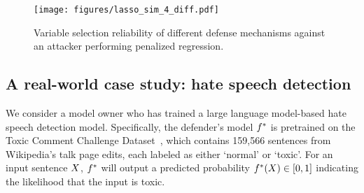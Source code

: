     \begin{figure}
        \centering
        \texttt{[image: figures/lasso\_sim\_4\_diff.pdf]}
        \caption{Variable selection reliability of different defense mechanisms against an attacker performing penalized regression. }
        \label{fig:compare_defense_lasso_diff}
    \end{figure} 


        



\subsection{A real-world case study: hate speech detection}\label{subsec:nlp}
    We consider a model owner who has trained a large language model-based hate speech detection model. 
    Specifically, the defender's model $f^*$ is pretrained on the Toxic Comment Challenge Dataset~\citep{jigsaw-toxic-comment-classification-challenge}, which contains 159,566 sentences from Wikipedia's talk page edits, each labeled as either `normal' or `toxic'. For an input sentence $X$, $f^*$ will output a predicted probability $f^*(X) \in [0, 1]$ indicating the likelihood that the input is toxic. 
    
